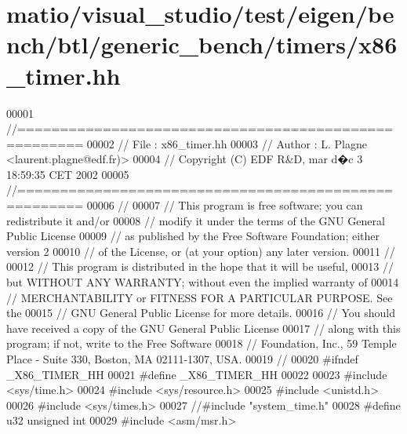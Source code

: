 \hypertarget{matio_2visual__studio_2test_2eigen_2bench_2btl_2generic__bench_2timers_2x86__timer_8hh_source}{}\section{matio/visual\+\_\+studio/test/eigen/bench/btl/generic\+\_\+bench/timers/x86\+\_\+timer.hh}
\label{matio_2visual__studio_2test_2eigen_2bench_2btl_2generic__bench_2timers_2x86__timer_8hh_source}

\begin{DoxyCode}
00001 \textcolor{comment}{//=====================================================}
00002 \textcolor{comment}{// File   :  x86\_timer.hh}
00003 \textcolor{comment}{// Author :  L. Plagne <laurent.plagne@edf.fr)>        }
00004 \textcolor{comment}{// Copyright (C) EDF R&D,  mar d�c 3 18:59:35 CET 2002}
00005 \textcolor{comment}{//=====================================================}
00006 \textcolor{comment}{// }
00007 \textcolor{comment}{// This program is free software; you can redistribute it and/or}
00008 \textcolor{comment}{// modify it under the terms of the GNU General Public License}
00009 \textcolor{comment}{// as published by the Free Software Foundation; either version 2}
00010 \textcolor{comment}{// of the License, or (at your option) any later version.}
00011 \textcolor{comment}{// }
00012 \textcolor{comment}{// This program is distributed in the hope that it will be useful,}
00013 \textcolor{comment}{// but WITHOUT ANY WARRANTY; without even the implied warranty of}
00014 \textcolor{comment}{// MERCHANTABILITY or FITNESS FOR A PARTICULAR PURPOSE.  See the}
00015 \textcolor{comment}{// GNU General Public License for more details.}
00016 \textcolor{comment}{// You should have received a copy of the GNU General Public License}
00017 \textcolor{comment}{// along with this program; if not, write to the Free Software}
00018 \textcolor{comment}{// Foundation, Inc., 59 Temple Place - Suite 330, Boston, MA  02111-1307, USA.}
00019 \textcolor{comment}{// }
00020 \textcolor{preprocessor}{#ifndef \_X86\_TIMER\_HH}
00021 \textcolor{preprocessor}{#define \_X86\_TIMER\_HH}
00022 
00023 \textcolor{preprocessor}{#include <sys/time.h>}
00024 \textcolor{preprocessor}{#include <sys/resource.h>}
00025 \textcolor{preprocessor}{#include <unistd.h>}
00026 \textcolor{preprocessor}{#include <sys/times.h>}
00027 \textcolor{comment}{//#include "system\_time.h"}
00028 \textcolor{preprocessor}{#define u32 unsigned int}
00029 \textcolor{preprocessor}{#include <asm/msr.h>}

\end{DoxyCode}
